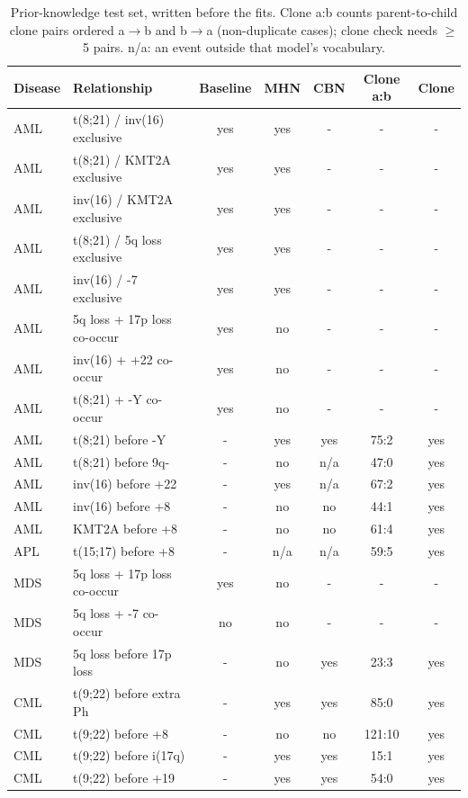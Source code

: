 \documentclass[conference]{IEEEtran}
\begin{document}
\begin{table}[!t]
\centering
\caption{Prior-knowledge test set, written before the fits. Clone a:b counts parent-to-child clone pairs ordered a$\rightarrow$b and b$\rightarrow$a (non-duplicate cases); clone check needs $\geq$ 5 pairs. n/a: an event outside that model's vocabulary.}
\label{tab:pk}
\footnotesize
\setlength{\tabcolsep}{3pt}
\begin{tabular}{llccccc}
\toprule
\textbf{Disease} & \textbf{Relationship} & \textbf{Baseline} & \textbf{MHN} & \textbf{CBN} & \textbf{Clone a:b} & \textbf{Clone} \\
\midrule
AML & t(8;21) / inv(16) exclusive & yes & yes & - & - & - \\
AML & t(8;21) / KMT2A exclusive & yes & yes & - & - & - \\
AML & inv(16) / KMT2A exclusive & yes & yes & - & - & - \\
AML & t(8;21) / 5q loss exclusive & yes & yes & - & - & - \\
AML & inv(16) / -7 exclusive & yes & yes & - & - & - \\
AML & 5q loss + 17p loss co-occur & yes & no & - & - & - \\
AML & inv(16) + +22 co-occur & yes & no & - & - & - \\
AML & t(8;21) + -Y co-occur & yes & no & - & - & - \\
AML & t(8;21) before -Y & - & yes & yes & 75:2 & yes \\
AML & t(8;21) before 9q- & - & no & n/a & 47:0 & yes \\
AML & inv(16) before +22 & - & yes & n/a & 67:2 & yes \\
AML & inv(16) before +8 & - & no & no & 44:1 & yes \\
AML & KMT2A before +8 & - & no & no & 61:4 & yes \\
APL & t(15;17) before +8 & - & n/a & n/a & 59:5 & yes \\
MDS & 5q loss + 17p loss co-occur & yes & no & - & - & - \\
MDS & 5q loss + -7 co-occur & no & no & - & - & - \\
MDS & 5q loss before 17p loss & - & no & yes & 23:3 & yes \\
CML & t(9;22) before extra Ph & - & yes & yes & 85:0 & yes \\
CML & t(9;22) before +8 & - & no & no & 121:10 & yes \\
CML & t(9;22) before i(17q) & - & yes & yes & 15:1 & yes \\
CML & t(9;22) before +19 & - & yes & yes & 54:0 & yes \\

\end{tabular}
\end{table}
\end{document}
